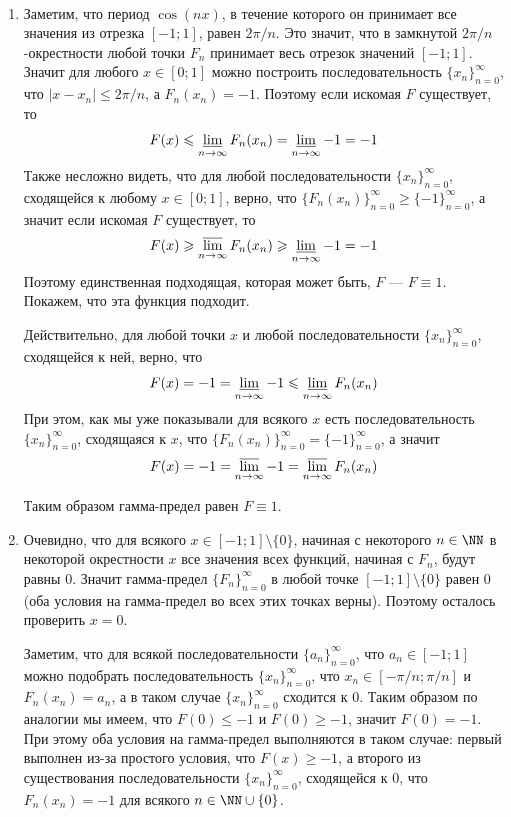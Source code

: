 \documentclass[12pt,a4paper]{article}
\begin{document}
    \begin{enumproblem}\ 
        \ItemedProblem
        \begin{enumerate}
            \item Заметим, что период $\cos(nx)$, в течение которого он принимает все значения из отрезка $[-1; 1]$, равен $2\pi/n$. Это значит, что в замкнутой $2\pi/n$-окрестности любой точки $F_n$ принимает весь отрезок значений $[-1; 1]$. Значит для любого $x \in [0;1]$ можно построить последовательность $\{x_n\}_{n = 0}^\infty$, что $|x-x_n|\leqslant 2\pi/n$, а $F_n(x_n) = -1$. Поэтому если искомая $F$ существует, то
            \[F(x) \leqslant \varliminf_{n \to \infty} F_n(x_n) = \varliminf_{n \to \infty} -1 = -1\]
            Также несложно видеть, что для любой последовательности $\{x_n\}_{n=0}^\infty$, сходящейся к любому $x \in [0; 1]$, верно, что $\{F_n(x_n)\}_{n=0}^\infty \geqslant \{-1\}_{n=0}^\infty$, а значит если искомая $F$ существует, то
            \[F(x) \geqslant \varlimsup_{n \to \infty} F_n(x_n) \geqslant \varliminf_{n \to \infty} -1 = -1\]
            Поэтому единственная подходящая, которая может быть, $F$ --- $F \equiv 1$. Покажем, что эта функция подходит.
            
            Действительно, для любой точки $x$ и любой последовательности $\{x_n\}_{n=0}^\infty$, сходящейся к ней, верно, что
            \[F(x) = -1 = \varliminf_{n \to \infty} -1 \leqslant \varliminf_{n \to \infty} F_n(x_n)\]
            При этом, как мы уже показывали для всякого $x$ есть последовательность $\{x_n\}_{n=0}^\infty$, сходящаяся к $x$, что $\{F_n(x_n)\}_{n=0}^\infty = \{-1\}_{n=0}^\infty$, а значит
            \[F(x) = -1 = \varlimsup_{n \to \infty} -1 = \varlimsup_{n \to \infty} F_n(x_n)\]

            Таким образом гамма-предел равен $F \equiv 1$.

            \item Очевидно, что для всякого $x \in [-1; 1] \setminus \{0\}$, начиная с некоторого $n \in \NN$ в некоторой окрестности $x$ все значения всех функций, начиная с $F_n$, будут равны $0$. Значит гамма-предел $\{F_n\}_{n=0}^\infty$ в любой точке $[-1; 1] \setminus \{0\}$ равен $0$ (оба условия на гамма-предел во всех этих точках верны). Поэтому осталось проверить $x = 0$.
            
            Заметим, что для всякой последовательности $\{a_n\}_{n=0}^\infty$, что $a_n \in [-1;1]$ можно подобрать последовательность $\{x_n\}_{n=0}^\infty$, что $x_n \in [-\pi/n;\pi/n]$ и $F_n(x_n) = a_n$, а в таком случае $\{x_n\}_{n=0}^\infty$ сходится к $0$. Таким образом по аналогии мы имеем, что $F(0) \leqslant -1$ и $F(0) \geqslant -1$, значит $F(0) = -1$. При этому оба условия на гамма-предел выполняются в таком случае: первый выполнен из-за простого условия, что $F(x) \geqslant -1$, а второго из существования последовательности $\{x_n\}_{n=0}^\infty$, сходящейся к $0$, что $F_n(x_n) = -1$ для всякого $n \in \NN \cup \{0\}$.
            

\end{enumerate}
\end{enumproblem}
\end{document}
